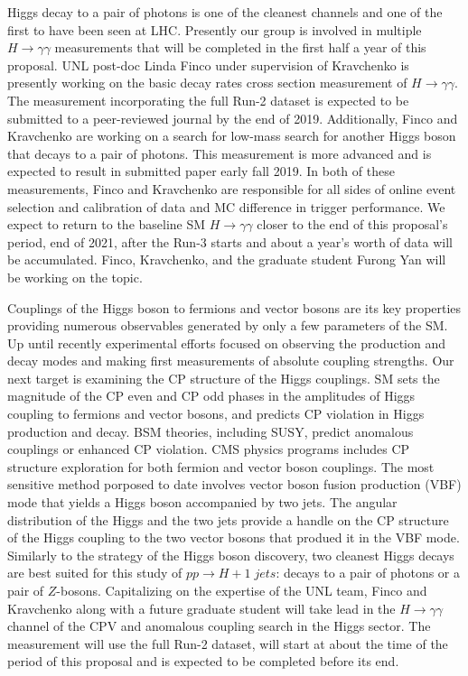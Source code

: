 Higgs decay to a pair of photons is one of the cleanest channels and one of the first to have been seen at LHC. Presently our group is involved in multiple $H\to\gamma\gamma$ measurements that will be completed in the first half a year of this proposal. UNL post-doc Linda Finco under supervision of Kravchenko is presently working on the basic decay rates cross section measurement of  $H\to\gamma\gamma$. The measurement incorporating the full Run-2 dataset is expected to be submitted to a peer-reviewed journal by the end of 2019. Additionally, Finco and Kravchenko are working on a search for low-mass search for another Higgs boson that decays to a pair of photons. This measurement is more advanced and is expected to result in submitted paper early fall 2019. In both of these measurements, Finco and Kravchenko are responsible for all sides of online event selection and calibration of data and MC difference in trigger performance. We expect to return to the baseline SM $H\to\gamma\gamma$ closer to the end of this proposal's period, end of 2021, after the Run-3 starts and about a year's worth of data will be accumulated. Finco, Kravchenko, and the graduate student Furong Yan will be working on the topic.

Couplings of the Higgs boson to fermions and vector bosons are its key properties providing numerous observables generated by only a few parameters of the SM. Up until recently experimental efforts focused on observing the production and decay modes and making first measurements of absolute coupling strengths. Our next target is examining the CP structure of the Higgs couplings. SM sets the magnitude of the CP even and CP odd phases in the amplitudes of Higgs coupling to fermions and vector bosons, and predicts CP violation in Higgs production and decay. BSM theories, including SUSY, predict anomalous couplings or enhanced CP violation. CMS physics programs includes CP structure exploration for both fermion and vector boson couplings. The most sensitive method porposed to date involves vector boson fusion production (VBF) mode that yields a Higgs boson accompanied by two jets. The angular distribution of the Higgs and the two jets provide a handle on the CP structure of the Higgs coupling to the two vector bosons that produed it in the VBF mode. Similarly to the strategy of the Higgs boson discovery, two cleanest Higgs decays are best suited for this study of $pp\to H+1\;jets$: decays to a pair of photons or a pair of $Z$-bosons. Capitalizing on the expertise of the UNL team, Finco and Kravchenko along with a future graduate student will take lead in the $H\to\gamma\gamma$ channel of the CPV and anomalous coupling search in the Higgs sector. The measurement will use the full Run-2 dataset, will start at about the time of the period of this proposal and is expected to be completed before its end.

